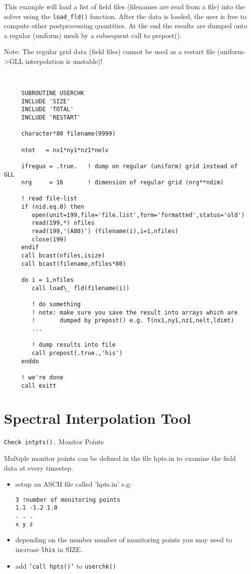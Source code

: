 This example will load a list of field files (filenames are read from a file) into the solver using the {\tt load\_fld()} function. After the data is loaded, the user is free to compute other postprocessing quantities. At the end the results are dumped onto a regular (uniform) mesh by a subsequent call to prepost().

Note: The regular grid data (field files) cannot be used as a restart file (uniform->GLL interpolation is unstable)!

\begin{verbatim}


     SUBROUTINE USERCHK
     INCLUDE 'SIZE'
     INCLUDE 'TOTAL'
     INCLUDE 'RESTART' 

     character*80 filename(9999)

     ntot   = nx1*ny1*nz1*nelv

     ifreguo = .true.   ! dump on regular (uniform) grid instead of GLL
     nrg     = 16       ! dimension of regular grid (nrg**ndim)
 
     ! read file-list
     if (nid.eq.0) then
        open(unit=199,file='file.list',form='formatted',status='old')
        read(199,*) nfiles
        read(199,'(A80)') (filename(i),i=1,nfiles)
        close(199)
     endif
     call bcast(nfiles,isize)
     call bcast(filename,nfiles*80)       

     do i = 1,nfiles
        call load\_ fld(filename(i))

        ! do something
        ! note: make sure you save the result into arrays which are
        !       dumped by prepost() e.g. T(nx1,ny1,nz1,nelt,ldimt)
        ...

        ! dump results into file
        call prepost(.true.,'his')
     enddo

     ! we're done
     call exitt

\end{verbatim}

\section{Spectral Interpolation Tool}

{\tt Check intpts().}
Monitor Points

Multiple monitor points can be defined in the file hpts.in to examine the field data at every timestep.

\begin{itemize}
\item setup an ASCII file called 'hpts.in' e.g: 
\begin{verbatim}
3 !number of monitoring points
1.1 -1.2 1.0
. . .
x y z
\end{verbatim}

\item depending on the number number of monitoring points you may need to increase {\tt lhis} in SIZE.
\item    add {\tt 'call hpts()'} to {\tt userchk()} 
\end{itemize}

